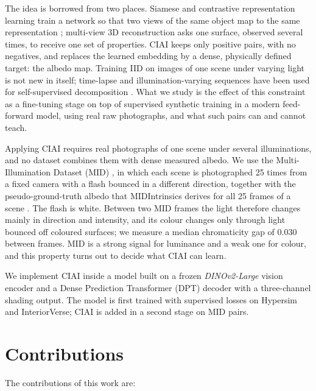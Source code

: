 The idea is borrowed from two places. Siamese and contrastive representation learning train
a network so that two views of the same object map to the same representation
; multi-view 3D reconstruction asks one surface, observed several
times, to receive one set of properties. CIAI keeps only positive pairs, with no negatives,
and replaces the learned embedding by a dense, physically defined target: the albedo map.
Training IID on images of one scene under varying light is not new in itself; time-lapse and
illumination-varying sequences have been used for self-supervised decomposition
. What we study is
the effect of this constraint as a fine-tuning stage on top of supervised synthetic training
in a modern feed-forward model, using real raw photographs, and what such pairs can and
cannot teach.

Applying CIAI requires real photographs of one scene under several illuminations, and no
dataset combines them with dense measured albedo. We use the Multi-Illumination Dataset
(MID) , in which each scene is photographed 25 times from a fixed
camera with a flash bounced in a different direction, together with the pseudo-ground-truth
albedo that MIDIntrinsics derives for all 25 frames of a scene .
The flash is white. Between two MID frames the light therefore changes mainly in direction
and intensity, and its colour changes only through light bounced off coloured surfaces; we
measure a median chromaticity gap of $0.030$ between frames. MID is a strong signal for
luminance and a weak one for colour, and this property turns out to decide what CIAI can
learn.

We implement CIAI inside a model built on a frozen \emph{DINOv2-Large} vision encoder
 and a Dense Prediction Transformer (DPT) decoder
 with a three-channel shading output.
The model is first trained with supervised losses on Hypersim 
and InteriorVerse; CIAI is added in a second stage on MID pairs.


\section{Contributions}

The contributions of this work are:

